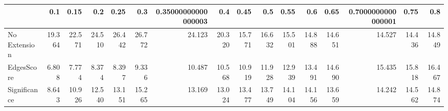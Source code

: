 \begin{tabular}{lrrrrrrrrrrrrrrr}
\toprule
{} &    0.1 &   0.15 &    0.2 &   0.25 &    0.3 & 0.35000000000000003 &    0.4 &   0.45 &    0.5 &   0.55 &    0.6 &   0.65 & 0.7000000000000001 &   0.75 &    0.8 \\
\midrule
No Extension & 19.364 & 22.571 & 24.510 & 26.442 & 26.772 &              24.123 & 20.320 & 15.771 & 16.632 & 15.501 & 14.888 & 14.651 &             14.527 & 14.436 & 14.849 \\
EdgesScore   &  6.808 &  7.774 &  8.374 &  8.397 &  9.336 &              10.487 & 10.568 & 10.919 & 11.928 & 12.939 & 13.491 & 14.690 &             15.435 & 15.818 & 16.467 \\
Significance &  8.643 & 10.926 & 12.540 & 13.151 & 15.265 &              13.169 & 13.024 & 13.477 & 13.749 & 14.104 & 14.156 & 13.659 &             14.242 & 14.562 & 14.874 \\
\bottomrule
\end{tabular}
